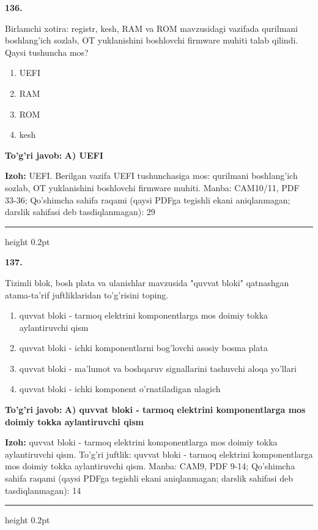 \documentclass[10pt,a4paper]{article}
\begin{document}
{\bfseries\sffamily\color{ink} 136.}
\par
Birlamchi xotira: registr, kesh, RAM va ROM mavzusidagi vazifada qurilmani boshlang'ich sozlab, OT yuklanishini boshlovchi firmware muhiti talab qilindi. Qaysi tushuncha mos?
\begin{enumerate}[label=\Alph*),leftmargin=9mm]
\item UEFI
\item RAM
\item ROM
\item kesh
\end{enumerate}
\begin{tcolorbox}[enhanced,breakable,colback=teal!4,colframe=teal!60!black,boxrule=0.45pt,arc=1.2mm,left=2.7mm,right=2.7mm,top=1.8mm,bottom=1.8mm,before skip=2mm,after skip=2mm]
{\bfseries\sffamily\color{teal}To'g'ri javob:} \textbf{A) UEFI}
\par\smallskip
{\bfseries Izoh:} UEFI. Berilgan vazifa UEFI tushunchasiga mos: qurilmani boshlang'ich sozlab, OT yuklanishini boshlovchi firmware muhiti. Manba: CAM10/11, PDF 33-36; Qo'shimcha sahifa raqami (qaysi PDFga tegishli ekani aniqlanmagan; darslik sahifasi deb tasdiqlanmagan): 29
\end{tcolorbox}
\vspace{2mm}\hrule height 0.2pt\vspace{3mm}

{\bfseries\sffamily\color{ink} 137.}
\par
Tizimli blok, bosh plata va ulanishlar mavzusida "quvvat bloki" qatnashgan atama-ta'rif juftliklaridan to'g'risini toping.
\begin{enumerate}[label=\Alph*),leftmargin=9mm]
\item quvvat bloki - tarmoq elektrini komponentlarga mos doimiy tokka aylantiruvchi qism
\item quvvat bloki - ichki komponentlarni bog'lovchi asosiy bosma plata
\item quvvat bloki - ma'lumot va boshqaruv signallarini tashuvchi aloqa yo'llari
\item quvvat bloki - ichki komponent o'rnatiladigan ulagich
\end{enumerate}
\begin{tcolorbox}[enhanced,breakable,colback=teal!4,colframe=teal!60!black,boxrule=0.45pt,arc=1.2mm,left=2.7mm,right=2.7mm,top=1.8mm,bottom=1.8mm,before skip=2mm,after skip=2mm]
{\bfseries\sffamily\color{teal}To'g'ri javob:} \textbf{A) quvvat bloki - tarmoq elektrini komponentlarga mos doimiy tokka aylantiruvchi qism}
\par\smallskip
{\bfseries Izoh:} quvvat bloki - tarmoq elektrini komponentlarga mos doimiy tokka aylantiruvchi qism. To'g'ri juftlik: quvvat bloki - tarmoq elektrini komponentlarga mos doimiy tokka aylantiruvchi qism. Manba: CAM9, PDF 9-14; Qo'shimcha sahifa raqami (qaysi PDFga tegishli ekani aniqlanmagan; darslik sahifasi deb tasdiqlanmagan): 14
\end{tcolorbox}
\vspace{2mm}\hrule height 0.2pt\vspace{3mm}
\end{document}
